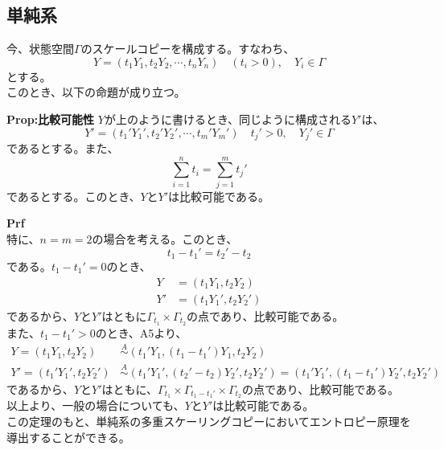 \documentclass[a4paper,11pt]{jsarticle}
\numberwithin{equation}{section}
\begin{document}
\subsection{単純系}
今、状態空間$\Gamma$のスケールコピーを構成する。すなわち、
\begin{equation}
    Y =(t_1 Y_1,t_2 Y_2,\cdots,t_n Y_n) \quad (t_i>0), \quad Y_i \in \Gamma
\end{equation}
とする。\\
このとき、以下の命題が成り立つ。
\begin{itembox}[l]{\textbf{Prop:比較可能性}}
    $Y$が上のように書けるとき、同じように構成される$Y'$は、
    \begin{equation}
        Y' =(t_1' Y_1',t_2' Y_2',\cdots,t_m' Y_m') \quad t_j'>0, \quad Y_j' \in \Gamma
    \end{equation}
    であるとする。また、
    \begin{equation}
        \sum_{i=1}^n t_i = \sum_{j=1}^m t_j'
    \end{equation}
    であるとする。このとき、$Y$と$Y'$は比較可能である。
\end{itembox}
\textbf{Prf}\\
特に、$n=m=2$の場合を考える。このとき、
\begin{equation}
    t_1-t_1' = t_2'-t_2
\end{equation}
である。$t_1-t_1' =0$のとき、
\begin{align}
    Y &= (t_1 Y_1,t_2 Y_2)\\
    Y' &= (t_1 Y_1',t_2 Y_2')
\end{align}
であるから、$Y$と$Y'$はともに$\Gamma _{t_1} \times \Gamma _{t_2}$の点であり、比較可能である。\\
また、$t_1-t_1' >0$のとき、A5より、
\begin{align}
    Y=(t_1 Y_1,t_2 Y_2) &\overset{A}{\sim} (t_1' Y_1,(t_1-t_1')Y_1,t_2 Y_2)\\
    Y'=(t_1' Y_1',t_2 Y_2') &\overset{A}{\sim} (t_1' Y_1',(t_2'-t_2)Y_2',t_2 Y_2')=(t_1' Y_1',(t_1-t_1')Y_2',t_2 Y_2')
\end{align}
であるから、$Y$と$Y'$はともに、$\Gamma _{t_1} \times \Gamma _{t_1-t_1'} \times \Gamma _{t_2}$の点であり、比較可能である。\\
以上より、一般の場合についても、$Y$と$Y'$は比較可能である。\hfill\qedsymbol\\
この定理のもと、単純系の多重スケーリングコピーにおいてエントロピー原理を導出することができる。\\
\end{document}
